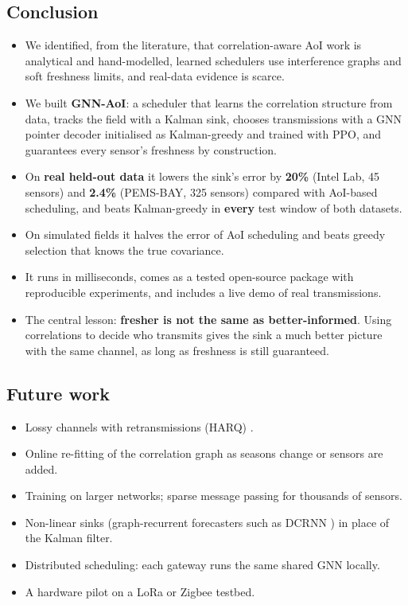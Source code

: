 \subsection{Conclusion}
\begin{itemize}
  \item We identified, from the literature, that correlation-aware AoI work is analytical and hand-modelled, learned
        schedulers use interference graphs and soft freshness limits, and real-data evidence is scarce.
  \item We built \textbf{GNN-AoI}: a scheduler that learns the correlation structure from data, tracks the field with a
        Kalman sink, chooses transmissions with a GNN pointer decoder initialised as Kalman-greedy and trained with PPO,
        and guarantees every sensor's freshness by construction.
  \item On \textbf{real held-out data} it lowers the sink's error by \textbf{20\%} (Intel Lab, 45 sensors) and
        \textbf{2.4\%} (PEMS-BAY, 325 sensors) compared with AoI-based scheduling, and beats Kalman-greedy in
        \textbf{every} test window of both datasets.
  \item On simulated fields it halves the error of AoI scheduling and beats greedy selection that knows the true
        covariance.
  \item It runs in milliseconds, comes as a tested open-source package with reproducible experiments, and includes a
        live demo of real transmissions.
  \item The central lesson: \textbf{fresher is not the same as better-informed}. Using correlations to decide who
        transmits gives the sink a much better picture with the same channel, as long as freshness is still
        guaranteed.
\end{itemize}

\subsection{Future work}
\begin{itemize}
  \item Lossy channels with retransmissions (HARQ) \cite{6}.
  \item Online re-fitting of the correlation graph as seasons change or sensors are added.
  \item Training on larger networks; sparse message passing for thousands of sensors.
  \item Non-linear sinks (graph-recurrent forecasters such as DCRNN \cite{24}) in place of the Kalman filter.
  \item Distributed scheduling: each gateway runs the same shared GNN locally.
  \item A hardware pilot on a LoRa or Zigbee testbed.
\end{itemize}

